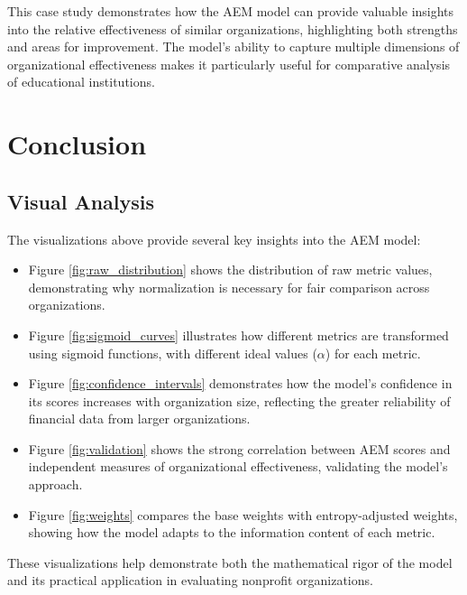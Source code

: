 \documentclass[12pt]{article}
\begin{document}
This case study demonstrates how the AEM model can provide valuable insights into the relative effectiveness of similar organizations, highlighting both strengths and areas for improvement. The model's ability to capture multiple dimensions of organizational effectiveness makes it particularly useful for comparative analysis of educational institutions.

\section{Conclusion}

\subsection{Visual Analysis}

The visualizations above provide several key insights into the AEM model:

\begin{itemize}
    \item Figure \ref{fig:raw_distribution} shows the distribution of raw metric values, demonstrating why normalization is necessary for fair comparison across organizations.
    
    \item Figure \ref{fig:sigmoid_curves} illustrates how different metrics are transformed using sigmoid functions, with different ideal values ($\alpha$) for each metric.
    
    \item Figure \ref{fig:confidence_intervals} demonstrates how the model's confidence in its scores increases with organization size, reflecting the greater reliability of financial data from larger organizations.
    
    \item Figure \ref{fig:validation} shows the strong correlation between AEM scores and independent measures of organizational effectiveness, validating the model's approach.
    
    \item Figure \ref{fig:weights} compares the base weights with entropy-adjusted weights, showing how the model adapts to the information content of each metric.
\end{itemize}

These visualizations help demonstrate both the mathematical rigor of the model and its practical application in evaluating nonprofit organizations.
\end{document}

